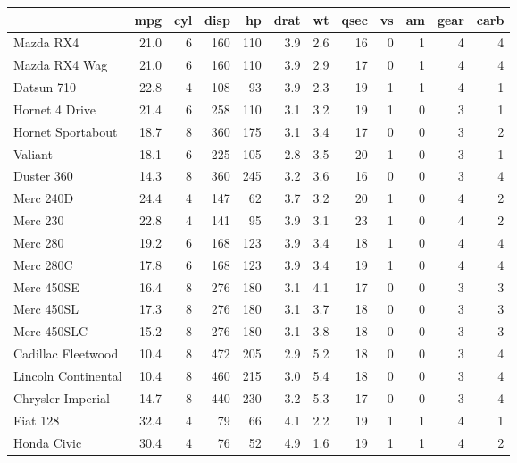 \begin{table}[ht]
\begin{center}
\begin{tabular}{l|rrrrrrrrrrr}
\hline
 & mpg & cyl & disp & hp & drat & wt & qsec & vs & am & gear & carb \\
\hline
Mazda RX4 & 21.0 & 6 & 160 & 110 & 3.9 & 2.6 & 16 & 0 & 1 & 4 & 4 \\
Mazda RX4 Wag & 21.0 & 6 & 160 & 110 & 3.9 & 2.9 & 17 & 0 & 1 & 4 & 4 \\
Datsun 710 & 22.8 & 4 & 108 & 93 & 3.9 & 2.3 & 19 & 1 & 1 & 4 & 1 \\
Hornet 4 Drive & 21.4 & 6 & 258 & 110 & 3.1 & 3.2 & 19 & 1 & 0 & 3 & 1 \\
Hornet Sportabout & 18.7 & 8 & 360 & 175 & 3.1 & 3.4 & 17 & 0 & 0 & 3 & 2 \\
Valiant & 18.1 & 6 & 225 & 105 & 2.8 & 3.5 & 20 & 1 & 0 & 3 & 1 \\
Duster 360 & 14.3 & 8 & 360 & 245 & 3.2 & 3.6 & 16 & 0 & 0 & 3 & 4 \\
Merc 240D & 24.4 & 4 & 147 & 62 & 3.7 & 3.2 & 20 & 1 & 0 & 4 & 2 \\
Merc 230 & 22.8 & 4 & 141 & 95 & 3.9 & 3.1 & 23 & 1 & 0 & 4 & 2 \\
Merc 280 & 19.2 & 6 & 168 & 123 & 3.9 & 3.4 & 18 & 1 & 0 & 4 & 4 \\
Merc 280C & 17.8 & 6 & 168 & 123 & 3.9 & 3.4 & 19 & 1 & 0 & 4 & 4 \\
Merc 450SE & 16.4 & 8 & 276 & 180 & 3.1 & 4.1 & 17 & 0 & 0 & 3 & 3 \\
Merc 450SL & 17.3 & 8 & 276 & 180 & 3.1 & 3.7 & 18 & 0 & 0 & 3 & 3 \\
Merc 450SLC & 15.2 & 8 & 276 & 180 & 3.1 & 3.8 & 18 & 0 & 0 & 3 & 3 \\
Cadillac Fleetwood & 10.4 & 8 & 472 & 205 & 2.9 & 5.2 & 18 & 0 & 0 & 3 & 4 \\
Lincoln Continental & 10.4 & 8 & 460 & 215 & 3.0 & 5.4 & 18 & 0 & 0 & 3 & 4 \\
Chrysler Imperial & 14.7 & 8 & 440 & 230 & 3.2 & 5.3 & 17 & 0 & 0 & 3 & 4 \\
Fiat 128 & 32.4 & 4 & 79 & 66 & 4.1 & 2.2 & 19 & 1 & 1 & 4 & 1 \\
Honda Civic & 30.4 & 4 & 76 & 52 & 4.9 & 1.6 & 19 & 1 & 1 & 4 & 2 \\

\end{tabular}
\end{center}
\end{table}
